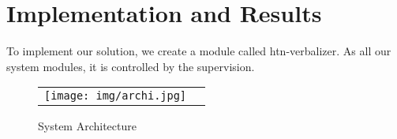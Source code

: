 \documentclass{llncs}
\begin{document}




\section{Implementation and Results}
\label{results}
To implement our solution, we create a module called htn-verbalizer. 
As all our system modules, it is controlled by the supervision.


\begin{figure}[ht!]

   \vspace{-20pt}
 \centering
 \begin{tabular}{cc}
  \texttt{[image: img/archi.jpg]}
 \end{tabular}
   \vspace{-8pt}
 \caption{System Architecture}
 \label{fig:architecture}
   \vspace{-20pt}
 \end{figure}
\end{document}

